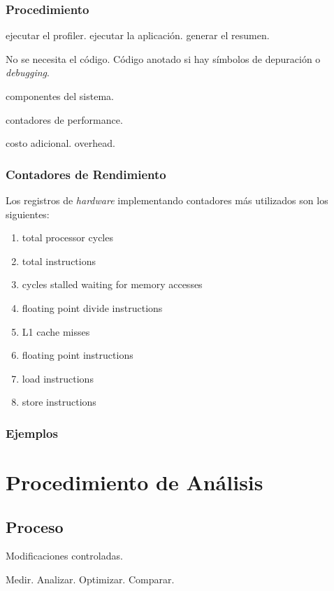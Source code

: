 \documentclass[a4paper]{report}
\begin{document}
\subsection{Procedimiento}

ejecutar el profiler. ejecutar la aplicaci\'on. generar el resumen.

No se necesita el c\'odigo. C\'odigo anotado si hay s\'imbolos de depuraci\'on o
{\it debugging}.

componentes del sistema.

contadores de performance.

costo adicional. overhead.

\subsection{Contadores de Rendimiento}

Los registros de {\it hardware} implementando contadores m\'as utilizados son los
siguientes:

\begin{enumerate}
\item total processor cycles
\item total instructions
\item cycles stalled waiting for memory accesses
\item floating point divide instructions
\item L1 cache misses
\item floating point instructions
\item load instructions
\item store instructions
\end{enumerate}

\subsection{Ejemplos}

\chapter{Procedimiento de An\'alisis}

\section{Proceso}

Modificaciones controladas.

\bigskip

Medir. Analizar. Optimizar. Comparar.
\end{document}
